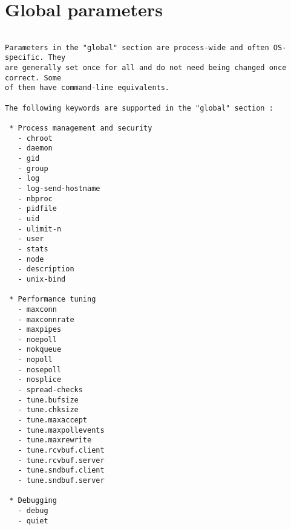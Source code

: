 
\chapter{Global parameters}

\begin{verbatim}

Parameters in the "global" section are process-wide and often OS-specific. They
are generally set once for all and do not need being changed once correct. Some
of them have command-line equivalents.

The following keywords are supported in the "global" section :

 * Process management and security
   - chroot
   - daemon
   - gid
   - group
   - log
   - log-send-hostname
   - nbproc
   - pidfile
   - uid
   - ulimit-n
   - user
   - stats
   - node
   - description
   - unix-bind

 * Performance tuning
   - maxconn
   - maxconnrate
   - maxpipes
   - noepoll
   - nokqueue
   - nopoll
   - nosepoll
   - nosplice
   - spread-checks
   - tune.bufsize
   - tune.chksize
   - tune.maxaccept
   - tune.maxpollevents
   - tune.maxrewrite
   - tune.rcvbuf.client
   - tune.rcvbuf.server
   - tune.sndbuf.client
   - tune.sndbuf.server

 * Debugging
   - debug
   - quiet


\end{verbatim}
